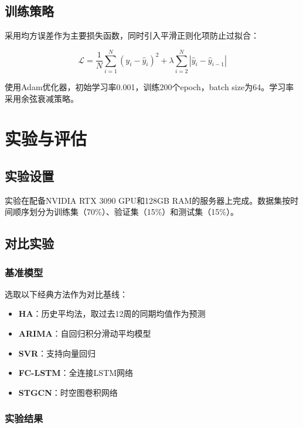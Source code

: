 \documentclass{harryopo-report}
\begin{document}
\section{训练策略}

采用均方误差作为主要损失函数，同时引入平滑正则化项防止过拟合：

\begin{equation}
\mathcal{L} = \frac{1}{N} \sum_{i=1}^{N} (y_i - \hat{y}_i)^2 + \lambda \sum_{i=2}^{N} |\hat{y}_i - \hat{y}_{i-1}|
\label{eq:loss}
\end{equation}

使用Adam优化器，初始学习率0.001，训练200个epoch，batch size为64。学习率采用余弦衰减策略。

\chapter{实验与评估}

\section{实验设置}

实验在配备NVIDIA RTX 3090 GPU和128GB RAM的服务器上完成。数据集按时间顺序划分为训练集（70\%）、验证集（15\%）和测试集（15\%）。

\section{对比实验}

\subsection{基准模型}

选取以下经典方法作为对比基线：
\begin{itemize}
    \item \textbf{HA}：历史平均法，取过去12周的同期均值作为预测
    \item \textbf{ARIMA}：自回归积分滑动平均模型
    \item \textbf{SVR}：支持向量回归
    \item \textbf{FC-LSTM}：全连接LSTM网络
    \item \textbf{STGCN}：时空图卷积网络
\end{itemize}

\subsection{实验结果}
\end{document}
